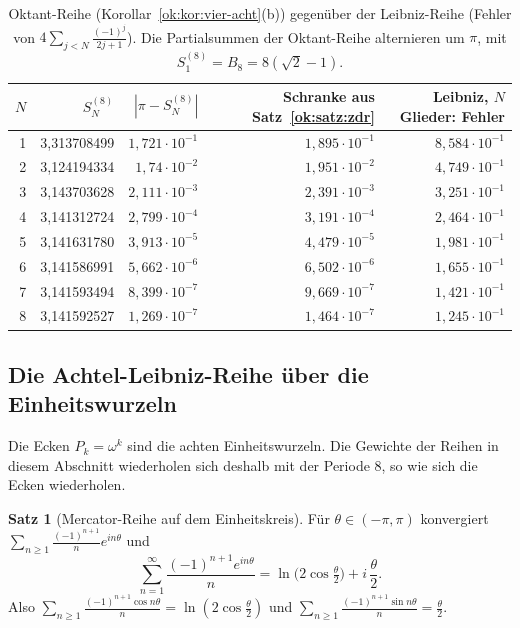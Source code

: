 \documentclass[a4paper,12pt,twoside]{report}
\theoremstyle{definition}
\newtheorem{satz}{Satz}
\begin{document}
\begin{table}[htbp]
\centering
\small
\begin{tabular}{r r r r r}
$N$ & $S_N^{(8)}$ & $|\pi-S_N^{(8)}|$ & Schranke aus Satz~\ref{ok:satz:zdr} & Leibniz, $N$ Glieder: Fehler\\\hline
1 & 3{,}313708499 & $1{,}721\cdot10^{-1}$ & $1{,}895\cdot10^{-1}$ & $8{,}584\cdot10^{-1}$\\
2 & 3{,}124194334 & $1{,}74\cdot10^{-2}$ & $1{,}951\cdot10^{-2}$ & $4{,}749\cdot10^{-1}$\\
3 & 3{,}143703628 & $2{,}111\cdot10^{-3}$ & $2{,}391\cdot10^{-3}$ & $3{,}251\cdot10^{-1}$\\
4 & 3{,}141312724 & $2{,}799\cdot10^{-4}$ & $3{,}191\cdot10^{-4}$ & $2{,}464\cdot10^{-1}$\\
5 & 3{,}141631780 & $3{,}913\cdot10^{-5}$ & $4{,}479\cdot10^{-5}$ & $1{,}981\cdot10^{-1}$\\
6 & 3{,}141586991 & $5{,}662\cdot10^{-6}$ & $6{,}502\cdot10^{-6}$ & $1{,}655\cdot10^{-1}$\\
7 & 3{,}141593494 & $8{,}399\cdot10^{-7}$ & $9{,}669\cdot10^{-7}$ & $1{,}421\cdot10^{-1}$\\
8 & 3{,}141592527 & $1{,}269\cdot10^{-7}$ & $1{,}464\cdot10^{-7}$ & $1{,}245\cdot10^{-1}$
\end{tabular}
\caption{Oktant-Reihe (Korollar~\ref{ok:kor:vier-acht}(b)) gegenüber der Leibniz-Reihe (Fehler von $4\sum_{j<N}\frac{(-1)^j}{2j+1}$). Die Partialsummen der Oktant-Reihe alternieren um $\pi$, mit $S_1^{(8)}=B_8=8(\sqrt2-1)$.}
\label{ok:tab:leibniz}
\end{table}

\subsection{Die Achtel-Leibniz-Reihe über die Einheitswurzeln}
\label{sec:ok:mercator}

Die Ecken $P_k=\omega^k$ sind die achten Einheitswurzeln. Die Gewichte der Reihen in diesem Abschnitt wiederholen sich deshalb mit der Periode 8, so wie sich die Ecken wiederholen.

\begin{satz}[Mercator-Reihe auf dem Einheitskreis]\label{ok:satz:mercator}
Für $\theta\in(-\pi,\pi)$ konvergiert $\sum_{n\ge1}\frac{(-1)^{n+1}}ne^{in\theta}$ und
\[
\sum_{n=1}^\infty\frac{(-1)^{n+1}e^{in\theta}}n=\ln\bigl(2\cos\tfrac\theta2\bigr)+i\,\frac\theta2 .
\]
Also $\sum_{n\ge1}\frac{(-1)^{n+1}\cos n\theta}n=\ln(2\cos\frac\theta2)$ und $\sum_{n\ge1}\frac{(-1)^{n+1}\sin n\theta}n=\frac\theta2$.
\end{satz}
\end{document}
